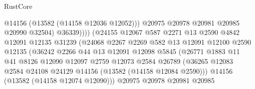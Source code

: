 \begin{lexlean}{RustCore}
\begin{coremodule}
                                          @14156
                                          (@13582 (@14158 @12036 @12052)))
                                        @20975
                                        @20978
                                        @20981
                                        @20985
                                        @20990
                                        @32504)
                                      @36339))))
                              (@24155
                                @12067
                                @587
                                @2271
                                @13
                                @2590
                                @4842
                                @12091
                                @12135
                                @31239
                                (@24068
                                  @2267
                                  @2269
                                  @582
                                  @13
                                  @12091
                                  @12100
                                  @2590
                                  @12135
                                  (@36242
                                    @2266
                                    @44
                                    @13
                                    @12091
                                    @12098
                                    @5845
                                    (@26771
                                      @1883
                                      @11
                                      @41
                                      @8126
                                      @12090
                                      @12097
                                      @2759
                                      @12073
                                      @2584
                                      @26789
                                      (@36265
                                        @12083
                                        @2584
                                        @24108
                                        @24129
                                        @14156
                                        (@13582 (@14158 @12084 @2590)))
                                      @14156
                                      (@13582 (@14158 @12074 @12090)))
                                    @20975
                                    @20978
                                    @20981
                                    @20985

\end{coremodule}
\end{lexlean}
